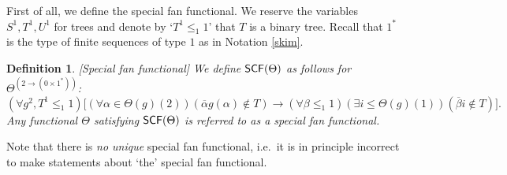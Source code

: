 \documentclass[reqno]{amsart}
\newtheorem{defi}[thm]{Definition}
\def\bdefi{\begin{defi}\rm}
\def\edefi{\end{defi}}
\def\di{\rightarrow}
\def\SCF{\textup{\textsf{SCF}}}
\numberwithin{equation}{section}
\numberwithin{thm}{section}
\begin{document}
\medskip

First of all, we define the special fan functional.  We reserve the variables $S^{1}, T^{1}, U^{1}$ for trees and denote by `$T^{1}\leq_{1}1$' that $T$ is a binary tree.  Recall that $1^{*}$ is the type of finite sequences of type $1$ as in Notation \ref{skim}. 
\bdefi[Special fan functional]
We define $\SCF(\Theta)$ as follows for $\Theta^{(2\di (0\times 1^{*}))}$:
\[
(\forall g^{2}, T^{1}\leq_{1}1)\big[(\forall \alpha \in \Theta(g)(2))  (\overline{\alpha}g(\alpha)\not\in T)
\di(\forall \beta\leq_{1}1)(\exists i\leq \Theta(g)(1))(\overline{\beta}i\not\in T) \big]. 
\]
Any functional $\Theta$ satisfying $\SCF(\Theta)$ is referred to as a \emph{special fan functional}.
\edefi
Note that there is \emph{no unique} special fan functional, i.e.\ it is in principle incorrect to make statements about `the' special fan functional. 

\medskip
\end{document}
